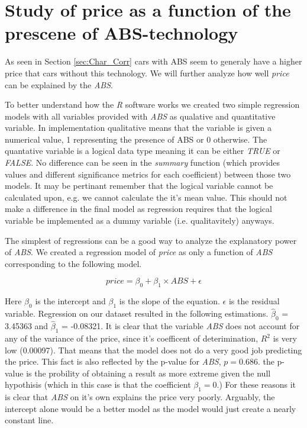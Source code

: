 \section{Study of price as a function of the prescene of ABS-technology} %
\label{sec:price_abs}

As seen in Section \ref{sec:Char_Corr} cars with ABS seem to generaly have a higher price that cars without this technology. We will further analyze how well \textit{price} can be explained by the \textit{ABS}.

\noindent
To better understand how the \textit{R} software works we created two simple regression models with all variables provided with \textit{ABS} as qualative and quantitative variable. In implementation qualitative means that the variable is given a numerical value, 1 representing the presence of ABS or 0 otherwise. The quantative variable is a logical data type meaning it can be either \textit{TRUE} or \textit{FALSE}. No difference can be seen in the \textit{summary} function (which provides values and different significance metrics for each coefficient) between those two models. It may be pertinant remember that the logical variable cannot be calculated upon, e.g. we cannot calculate the it's mean value. This should not make a difference in the final model as regression requires that the logical variable be implemented as a dummy variable (i.e. qualitavitely) anyways.

\noindent
The simplest of regressions can be a good way to analyze the explanatory power of \textit{ABS}. We created a regression model of \textit{price} as only a function of \textit{ABS} corresponding to the following model.

\begin{equation}
	price = \beta_0 + \beta_1 \times ABS + \epsilon
\end{equation}

\noindent
Here $\beta_0$ is the intercept and $\beta_1$ is the slope of the equation. $\epsilon$ is the residual variable. Regression on our dataset resulted in the following estimations. $\hat{\beta}_0$ = 3.45363 and $\hat{\beta}_1$ = -0.08321. It is clear that the variable \textit{ABS} does not account for any of the variance of the price, since it's coefficent of deterimination, $R^2$ is very low (0.00097). That means that the model does not do a very good job predicting the price. This fact is also reflected by the p-value for \textit{ABS}, $p=0.686$. the p-value is the probility of obtaining a result as more extreme given the null hypothisis (which in this case is that the coefficient $\beta_1 = 0$.) For these reasons it is clear that \textit{ABS} on it's own explains the price very poorly. Arguably, the intercept alone would be a better model as the model
would just create a nearly constant line.

